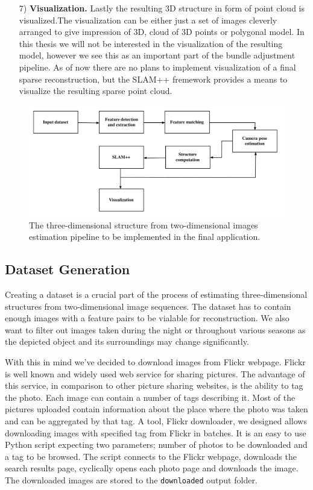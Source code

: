 \begin{itemize}
	\item[7)] \textbf{Visualization.} Lastly the resulting 3D structure in form of point cloud is visualized.The visualization can be either just a set of images cleverly arranged to give impression of 3D, cloud of 3D points or polygonal model. In this thesis we will not be interested in the visualization of the resulting model, however we see this as an important part of the bundle adjustment pipeline. As of now there are no plans to implement visualization of a final sparse reconstruction, but the SLAM++ fremework provides a means to visualize the resulting sparse point cloud. 
\end{itemize}

\begin{figure}[ht]
	\begin{center}
		\includegraphics[keepaspectratio,width=\textwidth]{fig/pipeline.pdf}
	\end{center}
	\caption{The three-dimensional structure from two-dimensional images estimation pipeline to be implemented in the final application.}
	\label{fig:pipeline}
\end{figure}

\subsection*{Dataset Generation}
Creating a dataset is a crucial part of the process of estimating three-dimensional structures from two-dimensional image sequences. The dataset has to contain enough images with a feature pairs to be vialable for reconstruction. We also want to filter out images taken during the night or throughout various seasons as the depicted object and its surroundings may change significantly.

With this in mind we've decided to download images from Flickr webpage. Flickr is well known and widely used web service for sharing pictures. The advantage of this service, in comparison to other picture sharing websites, is the ability to tag the photo. Each image can contain a number of tags describing it. Most of the pictures uploaded contain information about the place where the photo was taken and can be aggregated by that tag. A tool, Flickr downloader, we designed allows downloading images with specified tag from Flickr in batches. It is an easy to use Python script expecting two parameters; number of photos to be downloaded and a tag to be browsed. The script connects to the Flickr webpage, downloads the search results page, cyclically opens each photo page and downloads the image. The downloaded images are stored to the \texttt{downloaded} output folder.


